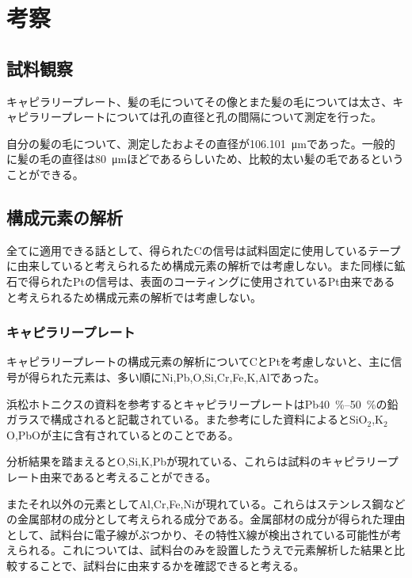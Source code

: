 \documentclass[titlepage,fontsize=10.5pt]{jlreq}
\begin{document}
\section{考察}
\subsection{試料観察} %

\label{sub:試料観察}
キャピラリープレート、髪の毛についてその像とまた髪の毛については太さ、キャピラリープレートについては孔の直径と孔の間隔について測定を行った。

自分の髪の毛について、測定したおよその直径が\qty{106.101}{\micro\metre}であった。一般的に髪の毛の直径は\qty{80}{\micro\metre}ほどであるらしいため、比較的太い髪の毛であるということができる。

\subsection{構成元素の解析} %
\label{sub:構成元素の解析}
全てに適用できる話として、得られたCの信号は試料固定に使用しているテープに由来していると考えられるため構成元素の解析では考慮しない。また同様に鉱石で得られたPtの信号は、表面のコーティングに使用されているPt由来であると考えられるため構成元素の解析では考慮しない。
    \subsubsection{キャピラリープレート} %
    \label{ssub:キャピラリープレート}
    キャピラリープレートの構成元素の解析についてCとPtを考慮しないと、主に信号が得られた元素は、多い順にNi,Pb,O,Si,Cr,Fe,K,Alであった。

    浜松ホトニクスの資料を参考するとキャピラリープレートはPb\qtyrange{40}{50}{\percent}の鉛ガラスで構成されると記載されている。また参考にした資料によるとSiO$_{2}$,K$_{2}$O,PbOが主に含有されているとのことである。

    分析結果を踏まえるとO,Si,K,Pbが現れている、これらは試料のキャピラリープレート由来であると考えることができる。
    
    またそれ以外の元素としてAl,Cr,Fe,Niが現れている。これらはステンレス鋼などの金属部材の成分として考えられる成分である。金属部材の成分が得られた理由として、試料台に電子線がぶつかり、その特性X線が検出されている可能性が考えられる。これについては、試料台のみを設置したうえで元素解析した結果と比較することで、試料台に由来するかを確認できると考える。
\end{document}
